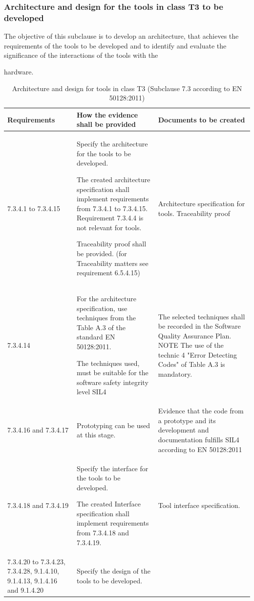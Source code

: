 \documentclass{template/openetcs_report}
\begin{document}
\subsubsection{Architecture and design for the tools in class T3 to be developed}
\begin{flushleft}
 The objective of this subclause is to develop an architecture, that achieves the requirements of the tools to be developed and to identify and evaluate the significance of the interactions of the tools with the
 \end{flushleft} hardware.
{\footnotesize\sffamily\centering
\begin{longtable}{|p{2cm}|p{9cm}|p{3cm}|}
\caption{Architecture and design for tools in class T3 (Subclause 7.3 according to EN 50128:2011)}\\
\hline
\bfseries Requirements & \bfseries How the evidence shall be provided & \bfseries Documents to be created\\
\hline
\hline
\endhead
\hline
\endfoot

7.3.4.1 to 7.3.4.15 & Specify the architecture for the tools to be developed.

The created architecture specification shall implement requirements from 7.3.4.1 to 7.3.4.15.
Requirement 7.3.4.4 is not relevant for tools.

Traceability proof shall be provided. (for Traceability matters see requirement 6.5.4.15)
& Architecture specification for tools.
Traceability proof\\ 
\hline
7.3.4.14 & For the architecture specification, use techniques from the Table A.3 of the standard EN 50128:2011.

The techniques used, must be suitable for the software safety integrity level SIL4
& The selected techniques shall be recorded in the Software Quality Assurance Plan.
\linebreak
\linebreak
NOTE\linebreak
The use of the technic 4 "Error Detecting Codes" of Table A.3 is mandatory.\\ 
\hline
7.3.4.16 and 7.3.4.17 & Prototyping can be used at this stage.
& Evidence that the code from a prototype and its development and documentation fulfills SIL4 according to EN 50128:2011\\ 
\hline
7.3.4.18 and 7.3.4.19 & Specify the interface for the tools to be developed.

The created Interface specification shall implement requirements from 7.3.4.18 and 7.3.4.19.
& Tool interface specification.\\ 
\hline
7.3.4.20 to 7.3.4.23, 7.3.4.28, 9.1.4.10, 9.1.4.13, 9.1.4.16 and 9.1.4.20
& Specify the design of the tools to be developed.


\end{longtable}}
\end{document}
